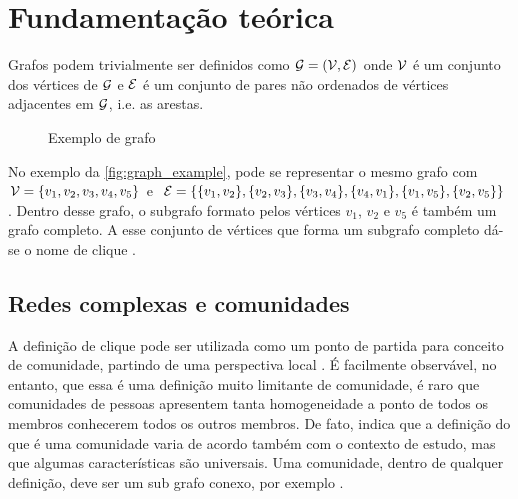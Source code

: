 \documentclass[notes.tex]{subfiles}
\begin{document}
\chapter{Fundamentação teórica}

Grafos podem trivialmente ser definidos como $\operatorname{\mathcal{G}} = (\operatorname{\mathcal{V}}, \operatorname{\mathcal{E}})$ onde $\operatorname{\mathcal{V}}$ é um conjunto dos vértices de  $\operatorname{\mathcal{G}}$ e  $\operatorname{\mathcal{E}}$ é um conjunto de pares não ordenados de vértices adjacentes em $\operatorname{\mathcal{G}}$, i.e. as arestas.

\begin{figure}[htpb]
    \centering
    \caption{Exemplo de grafo}\label{fig:graph_example}
\end{figure}

No exemplo da \autoref{fig:graph_example}, pode se representar o mesmo grafo com $\operatorname{\mathcal{V}} = \{v_1, v_2, v_3, v_4, v_5\}$ e $\operatorname{\mathcal{E}} = \{\{v_1, v_2\}, \{v_2, v_3\}, \{v_3, v_4\}, \{v_4, v_1\}, \{v_1, v_5\}, \{v_2, v_5\}\}$.
Dentro desse grafo, o subgrafo formato pelos vértices $v_1$, $v_2$ e $v_5$ é também um grafo completo.
A esse conjunto de vértices que forma um subgrafo completo dá-se o nome de clique \cite{fortunato2010community}.

\section{Redes complexas e comunidades}

A definição de clique pode ser utilizada como um ponto de partida para conceito de comunidade, partindo de uma perspectiva local \cite{fortunato2010community}.
É facilmente observável, no entanto, que essa é uma definição muito limitante de comunidade, é raro que comunidades de pessoas apresentem tanta homogeneidade a ponto de todos os membros conhecerem todos os outros membros.
De fato,  indica que a definição do que é uma comunidade varia de acordo também com o contexto de estudo, mas que algumas características são universais.
Uma comunidade, dentro de qualquer definição, deve ser um sub grafo conexo, por exemplo \cite{fortunato2010community}. 
\end{document}
